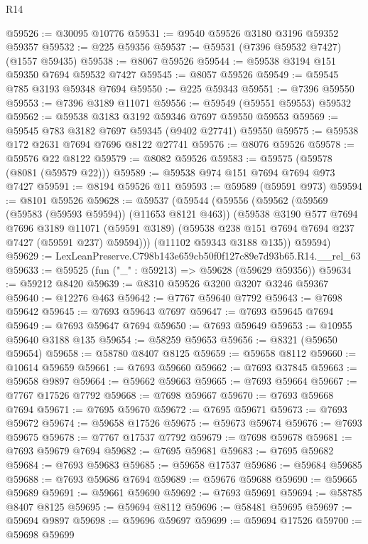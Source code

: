 \begin{lexlean}{R14}
\begin{coremodule}
@59526 := @30095 @10776
@59531 := @9540 @59526 @3180 @3196 @59352 @59357
@59532 := @225 @59356
@59537 := @59531 (@7396 @59532 @7427) (@1557 @59435)
@59538 := @8067 @59526
@59544 := @59538 @3194 @151 @59350 @7694 @59532 @7427
@59545 := @8057 @59526
@59549 := @59545 @785 @3193 @59348 @7694
@59550 := @225 @59343
@59551 := @7396 @59550
@59553 := @7396 @3189 @11071
@59556 := @59549 (@59551 @59553) @59532
@59562 := @59538 @3183 @3192 @59346 @7697 @59550 @59553
@59569 := @59545 @783 @3182 @7697 @59345 (@9402 @27741) @59550
@59575 := @59538 @172 @2631 @7694 @7696 @8122 @27741
@59576 := @8076 @59526
@59578 := @59576 @22 @8122
@59579 := @8082 @59526
@59583 := @59575 (@59578 (@8081 (@59579 @22)))
@59589 := @59538 @974 @151 @7694 @7694 @973 @7427
@59591 := @8194 @59526 @11
@59593 := @59589 (@59591 @973)
@59594 := @8101 @59526
@59628 := @59537
    (@59544
      (@59556
        (@59562
          (@59569 (@59583 (@59593 @59594)) (@11653 @8121 @463))
          (@59538
            @3190
            @577
            @7694
            @7696
            @3189
            @11071
            (@59591 @3189)
            (@59538 @238 @151 @7694 @7694 @237 @7427 (@59591 @237) @59594)))
        (@11102 @59343 @3188 @135))
      @59594)
@59629 := LexLeanPreserve.C798b143e659cb50f0f127c89e7d93b65.R14.__rel_63
@59633 := @59525 (fun ("_" : @59213) => @59628 (@59629 @59356))
@59634 := @59212 @8420
@59639 := @8310 @59526 @3200 @3207 @3246 @59367
@59640 := @12276 @463
@59642 := @7767 @59640 @7792
@59643 := @7698 @59642
@59645 := @7693 @59643 @7697
@59647 := @7693 @59645 @7694
@59649 := @7693 @59647 @7694
@59650 := @7693 @59649
@59653 := @10955 @59640 @3188 @135
@59654 := @58259 @59653
@59656 := @8321 (@59650 @59654)
@59658 := @58780 @8407 @8125
@59659 := @59658 @8112
@59660 := @10614 @59659
@59661 := @7693 @59660
@59662 := @7693 @37845
@59663 := @59658 @9897
@59664 := @59662 @59663
@59665 := @7693 @59664
@59667 := @7767 @17526 @7792
@59668 := @7698 @59667
@59670 := @7693 @59668 @7694
@59671 := @7695 @59670
@59672 := @7695 @59671
@59673 := @7693 @59672
@59674 := @59658 @17526
@59675 := @59673 @59674
@59676 := @7693 @59675
@59678 := @7767 @17537 @7792
@59679 := @7698 @59678
@59681 := @7693 @59679 @7694
@59682 := @7695 @59681
@59683 := @7695 @59682
@59684 := @7693 @59683
@59685 := @59658 @17537
@59686 := @59684 @59685
@59688 := @7693 @59686 @7694
@59689 := @59676 @59688
@59690 := @59665 @59689
@59691 := @59661 @59690
@59692 := @7693 @59691
@59694 := @58785 @8407 @8125
@59695 := @59694 @8112
@59696 := @58481 @59695
@59697 := @59694 @9897
@59698 := @59696 @59697
@59699 := @59694 @17526
@59700 := @59698 @59699

\end{coremodule}
\end{lexlean}
